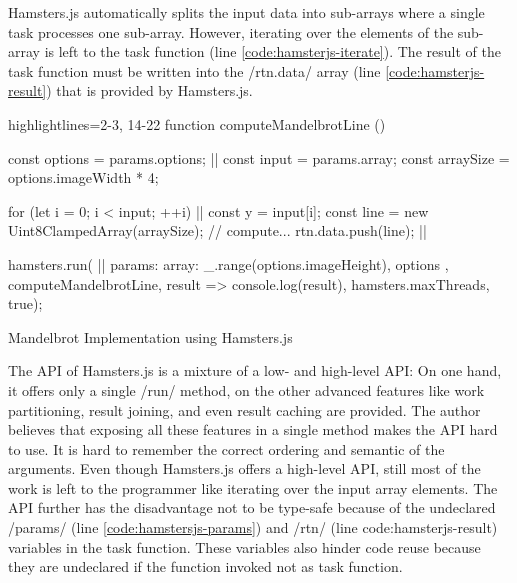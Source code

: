 Hamsters.js automatically splits the input data into sub-arrays where a single task processes one sub-array. However, iterating over the elements of the sub-array is left to the task function (line \ref{code:hamsterjs-iterate}). The result of the task function must be written into the \javascriptinline/rtn.data/ array (line \ref{code:hamsterjs-result}) that is provided by Hamsters.js. 

\begin{listing}
\begin{javascriptcode*}{highlightlines={2-3, 14-22}}
function computeMandelbrotLine () {
	const options = params.options; |$\label{code:hamstersjs-params}$|
	const input = params.array;
	const arraySize = options.imageWidth * 4;

	for (let i = 0; i < input; ++i) {|$\label{code:hamsterjs-iterate}$|
		const y = input[i];
		const line = new Uint8ClampedArray(arraySize);
		// compute...
		rtn.data.push(line); |$\label{code:hamsterjs-result}$|
	}
}

hamsters.run( |$\label{code:hamsterjs-start}$|
	params: {
		array: _.range(options.imageHeight),
		options
	},  
	computeMandelbrotLine, 
	result => console.log(result), 
	hamsters.maxThreads, 
	true);
\end{javascriptcode*}
\caption{Mandelbrot Implementation using Hamsters.js}
\label{fig:mandelbrot-hamsterjs}
\end{listing}

The API of Hamsters.js is a mixture of a low- and high-level API: On one hand, it offers only a single \javascriptinline/run/ method, on the other advanced features like work partitioning, result joining, and even result caching are provided. The author believes that exposing all these features in a single method makes the API hard to use. It is hard to remember the correct ordering and semantic of the arguments. Even though Hamsters.js offers a high-level API, still most of the work is left to the programmer like iterating over the input array elements. The API further has the disadvantage not to be type-safe because of the undeclared \javascriptinline/params/ (line \ref{code:hamstersjs-params}) and \javascriptinline/rtn/ (line code:hamsterjs-result) variables in the task function. These variables also hinder code reuse because they are undeclared if the function invoked not as task function.

